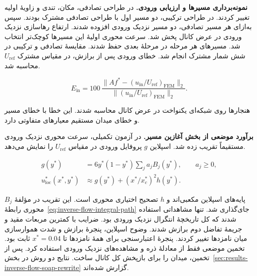 \begin{FlowRevisionText}
\textbf{نمونه‌برداری مسیرها و ارزیابی ورودی.}
در طراحی تصادفی، مکان، تندی و زاویهٔ اولیه تغییر کردند.
در طراحی ترکیبی، دو مسیر اول با طراحی تصادفی مشترک بودند.
سپس به‌ازای هر مسیر تصادفی، دو مسیر نزدیک ورودی افزوده شدند.
ارتفاع رهاسازی نزدیک ورودی در عرض کانال پخش شد.
سرعت محوری اولیهٔ این مسیرها کوچک‌تر انتخاب شد.
مسیرهای هر مرحله در مرحلهٔ بعدی حفظ شدند.
مقایسهٔ تصادفی و ترکیبی در شش شمار مشترک انجام شد.
خطای ورودی پس از برازش، در مقیاس مشترک $U_{\mathrm{ref}}$ محاسبه شد.

\begin{equation}
E_{\mathrm{in}}=
100\,
\frac{\|A f^*-\left(u_{\mathrm{in}}/U_{\mathrm{ref}}\right)_{\mathrm{FEM}}\|_2}
{\|\left(u_{\mathrm{in}}/U_{\mathrm{ref}}\right)_{\mathrm{FEM}}\|_2}.
\label{eq:inverse-flow-soap-inlet-error}
\end{equation}

هنجارها روی شبکه‌ای یکنواخت در عرض کانال محاسبه شدند.
این خطا با خطای مسیر و خطای میدان مستقیم معیارهای متفاوتی دارد.

\textbf{برآورد موضعی از بخش آغازین مسیر.}
در آزمون تکمیلی، سرعت محوری نزدیک ورودی مستقیماً تقریب زده شد.
اسپلاین $g$ پروفایل ورودی در مقیاس $U_{\mathrm{ref}}$ را نمایش می‌دهد.

\begin{equation}
\begin{aligned}
g(y^*)&=6y^*(1-y^*)\sum_j a_j B_j(y^*),\qquad a_j\geq0,\\
u_{\mathrm{loc}}^*(x^*,y^*)&\approx g(y^*)+
        \left(x^*/x_c^*\right)^2 h(y^*).
\end{aligned}
\label{eq:inverse-flow-local-profile}
\end{equation}

$B_j$ پایه‌های اسپلاین مکعبی‌اند و $h$ تصحیح اختیاری محوری است.
این تقریب در مؤلفهٔ محوری رابطهٔ~\eqref{eq:inverse-flow-integral-path} جای‌گذاری شد.
تنها مشاهداتی استفاده شدند که کل تاریخچهٔ انتگرال نزدیک ورودی بود.
ضرایب با کمترین مربعات مقید و جریمهٔ تفاضل دوم برازش شدند.
وضوح اسپلاین، پنجرهٔ برازش و شدت هموارسازی میان نامزدها تغییر کردند.
پنجرهٔ اعتبارسنجی برای همهٔ نامزدها تا $x^*=0.04$ ثابت بود.
تخمین موضعی فقط از معادلهٔ ذره و مشاهده‌های نزدیک ورودی استفاده کرد.
 پس از تخمین، میدان را برای بازپخش کل کانال ساخت.
نتایج دو روش در بخش~\ref{sec:results-inverse-flow-soap-rewrite} گزارش شده‌اند.
\end{FlowRevisionText}

